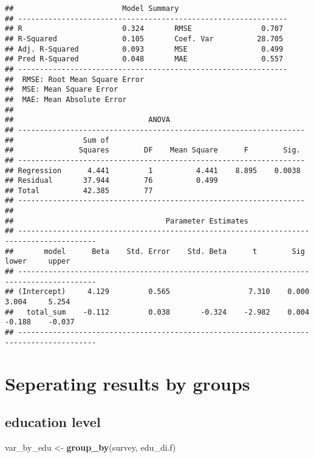 \documentclass[]{article}
\newenvironment{Shaded}{\begin{snugshade}}{\end{snugshade}}
\newcommand{\KeywordTok}[1]{\textcolor[rgb]{0.13,0.29,0.53}{\textbf{#1}}}
\newcommand{\StringTok}[1]{\textcolor[rgb]{0.31,0.60,0.02}{#1}}
\newcommand{\NormalTok}[1]{#1}
\begin{document}
\begin{verbatim}
##                         Model Summary                          
## --------------------------------------------------------------
## R                       0.324       RMSE                0.707 
## R-Squared               0.105       Coef. Var          28.705 
## Adj. R-Squared          0.093       MSE                 0.499 
## Pred R-Squared          0.048       MAE                 0.557 
## --------------------------------------------------------------
##  RMSE: Root Mean Square Error 
##  MSE: Mean Square Error 
##  MAE: Mean Absolute Error 
## 
##                               ANOVA                                
## ------------------------------------------------------------------
##                Sum of                                             
##               Squares        DF    Mean Square      F        Sig. 
## ------------------------------------------------------------------
## Regression      4.441         1          4.441    8.895    0.0038 
## Residual       37.944        76          0.499                    
## Total          42.385        77                                   
## ------------------------------------------------------------------
## 
##                                   Parameter Estimates                                    
## ----------------------------------------------------------------------------------------
##       model      Beta    Std. Error    Std. Beta      t        Sig      lower     upper 
## ----------------------------------------------------------------------------------------
## (Intercept)     4.129         0.565                  7.310    0.000     3.004     5.254 
##   total_sum    -0.112         0.038       -0.324    -2.982    0.004    -0.188    -0.037 
## ----------------------------------------------------------------------------------------
\end{verbatim}

\section{Seperating results by
groups}\label{seperating-results-by-groups}

\subsection{education level}\label{education-level}

\begin{Shaded}
\begin{Highlighting}[]
\NormalTok{var_by_edu <-}\StringTok{ }\KeywordTok{group_by}\NormalTok{(survey, edu_di.f)}
\end{Highlighting}
\end{Shaded}
\end{document}
